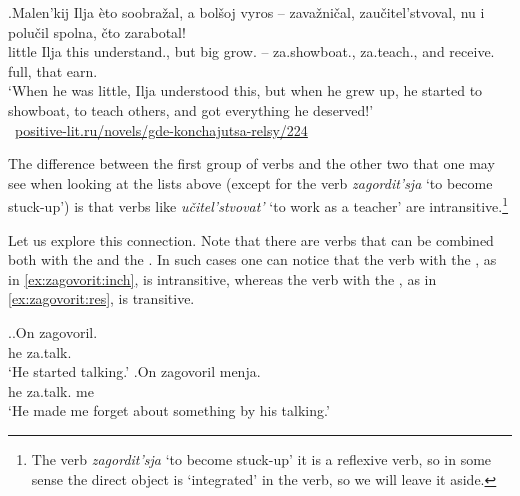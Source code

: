 \exg.\label{ex:zateach}Malen'kij Ilja \`{e}to soobra\v{z}al, a bol\v{s}oj vyros -- zava\v{z}ni\v{c}al, zau\v{c}itel'stvoval, {nu i} polu\v{c}il spolna, \v{c}to zarabotal!\\
little Ilja this understand., but big grow. -- za.showboat., za.teach., {and} receive. full, that earn.\\
\trans `When he was little, Ilja understood this, but when he grew up, he started to showboat, to teach others, and got everything he deserved!'\\\hbox{}\hfill\hbox{
\url{positive-lit.ru/novels/gde-konchajutsa-relsy/224}}

The difference between the first group of verbs and the other two that one may see when looking at the lists above (except for the verb \textit{zagordit'sja} `to become stuck-up') is that verbs like \textit{u\v{c}itel'stvovat'} `to work as a teacher' are intransitive.\footnote{The verb \textit{zagordit'sja} `to become stuck-up' it is a reflexive verb, so in some sense the direct object is `integrated' in the verb, so we will leave it aside.}

Let us explore this connection. Note that there are verbs that can be combined both with the  and the  . In such cases one can notice that the verb with the  , as in \ref{ex:zagovorit:inch}, is intransitive, whereas the verb with the  , as in \ref{ex:zagovorit:res}, is transitive.

\ex.\ag.\label{ex:zagovorit:inch}On zagovoril.\\
he za.talk.\\
\trans `He started talking.'
\bg.\label{ex:zagovorit:res}On zagovoril menja.\\
he za.talk. me\\
\trans `He made me forget about something by his talking.'
 
